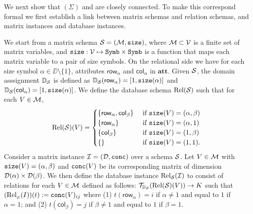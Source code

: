 \newcommand{\row}{\mathsf{row}}
\newcommand{\rows}{\mathsf{rows}}
\newcommand{\col}{\mathsf{col}}
\newcommand{\cols}{\mathsf{cols}}

We next show that \lang$(\Sigma)$ and \ARA are closely connected. To make this correspond formal we first establish a link between matrix schemas and relation schemas, and matrix instances and database instances.

We start from a matrix schema $\mathcal{S}=(\mathcal{M},\texttt{size})$, where $\mathcal{M}\subset \mathcal{V}$ is a finite set of matrix variables, and $\texttt{size}: \mathcal{V} \mapsto \texttt{Symb}\times \texttt{Symb}$ is a function that maps each matrix variable to a pair of size symbols. On the relational side
we have for each size symbol $\alpha\in\DD\setminus\{1\}$, attributes $\row_\alpha$ and $\col_\alpha$ in $\mathbf{att}$. Given
$\mathcal{S}$, the domain asssignment $\mathbb{D}_{\mathcal{S}}$ is defined as 
$\mathbb{D}_\Sch(\row_\alpha)=[1,\size(\alpha)]$ and 
$\mathbb{D}_\Sch(\col_\alpha)=[1,\size(\alpha)]$. We define the database  schema $\text{Rel}(\mathcal{S})$ such that for each $V\in\mathcal{M}$,
\[
	\text{Rel}(\Sch)(V) = \begin{cases}
		\lbrace\row_\alpha,\col_\beta \rbrace & \text{ if $ \size(V)=(\alpha,\beta)$} \\
		\lbrace\row_\alpha \rbrace & \text{ if $ \size(V)=(\alpha,1)$} \\
		\lbrace\col_\beta \rbrace  &
	 \text{ if $ \size(V)=(1,\beta)$} \\
		\lbrace\rbrace & \text{ if $\size(V)=(1,1)$}.
\end{cases}
\]
Consider a matrix instance $\mathcal{I} = (\mathcal{D},\texttt{conc})$ over a schema $\mathcal{S}$.
Let $V\in\mathcal{M}$ with $\texttt{size}(V)=(\alpha,\beta)$ and $\texttt{conc}(V)$ be its corresponding matrix of dimension $\mathcal{D}(\alpha)\times \mathcal{D}(\beta)$.
We then define the database instance $\text{Rel}_{\mathcal{S}}(\mathcal{I})$  to consist of relations for each $V\in\mathcal{M}$ defined as follows:
$\mathcal{T}_{\mathbb{D}_{\mathcal{S}}}(\text{Rel}(\mathcal{S})(V)) \to K$ such that
$(\text{Rel}_{_{\mathcal{S}}}(I))(t):=\texttt{conc}(V)_{ij}$ where (1) $t(\row_\alpha)=i$ if $\alpha\neq 1$ and equal to $1$ if $\alpha = 1$; and (2) $t(\col_\beta)=j$ if $\beta\neq 1$ and equal to $1$ if $\beta= 1$.

